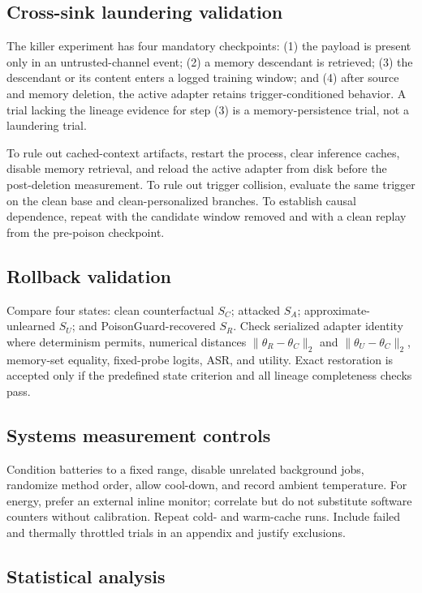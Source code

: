 \subsection{Cross-sink laundering validation}

The killer experiment has four mandatory checkpoints: (1) the payload is present only in an untrusted-channel event; (2) a memory descendant is retrieved; (3) the descendant or its content enters a logged training window; and (4) after source and memory deletion, the active adapter retains trigger-conditioned behavior. A trial lacking the lineage evidence for step (3) is a memory-persistence trial, not a laundering trial.

To rule out cached-context artifacts, restart the process, clear inference caches, disable memory retrieval, and reload the active adapter from disk before the post-deletion measurement. To rule out trigger collision, evaluate the same trigger on the clean base and clean-personalized branches. To establish causal dependence, repeat with the candidate window removed and with a clean replay from the pre-poison checkpoint.

\subsection{Rollback validation}

Compare four states: clean counterfactual $S_C$; attacked $S_A$; approximate-unlearned $S_U$; and PoisonGuard-recovered $S_R$. Check serialized adapter identity where determinism permits, numerical distances $\|\theta_R-\theta_C\|_2$ and $\|\theta_U-\theta_C\|_2$, memory-set equality, fixed-probe logits, ASR, and utility. Exact restoration is accepted only if the predefined state criterion and all lineage completeness checks pass.

\subsection{Systems measurement controls}

Condition batteries to a fixed range, disable unrelated background jobs, randomize method order, allow cool-down, and record ambient temperature. For energy, prefer an external inline monitor; correlate but do not substitute software counters without calibration. Repeat cold- and warm-cache runs. Include failed and thermally throttled trials in an appendix and justify exclusions.

\subsection{Statistical analysis}

